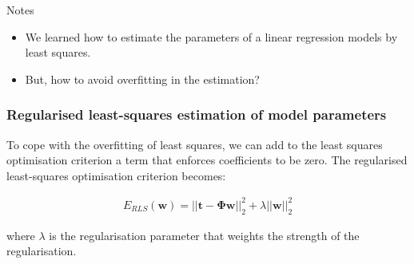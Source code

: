 \begin{frame}

\begin{alertblock}{Notes}
    \begin{itemize}
        \item We learned how to estimate the parameters of a linear regression
            models by least squares.
        \item But, how to avoid overfitting in the estimation?
    \end{itemize}
\end{alertblock}

\end{frame}

\begin{frame}
    \frametitle{Regularised least-squares estimation of model parameters}

    To cope with the overfitting of least squares, we can add to the least
    squares optimisation criterion a term that enforces coefficients to be
    zero. The regularised least-squares optimisation criterion becomes:

    \begin{align*}
        E_{RLS}(\mathbf{w})=||\mathbf{t}-\boldsymbol{\Phi}\mathbf{w}||_2^2+\lambda||\mathbf{w}||_2^2
    \end{align*}

    where $\lambda$ is the regularisation parameter that weights the strength
    of the regularisation.
\end{frame}

